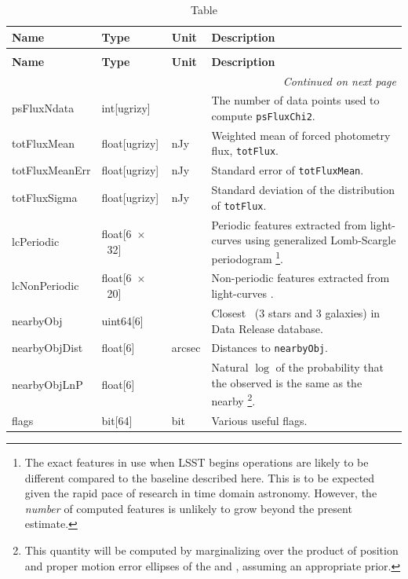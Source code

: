 \documentclass[SE,lsstdraft,toc]{lsstdoc}
\newcommand\x         {\hbox{$\times$}}
\renewcommand{\DR}{{Data Release database}\xspace}
\newenvironment{schema}[3]{%
\setlength\LTleft{0pt}
\setlength\LTright{\fill}
\begin{longtable}{p{0.2\textwidth}p{0.14\textwidth}p{0.14\textwidth}p{0.41\textwidth}}

\caption[#1]{#2\label{#3}}\\

\hline \textbf{Name} & \textbf{Type} & \textbf{Unit} & \textbf{Description}\\ \hline
\endfirsthead

\caption[#1]{#2}\\

\hline \textbf{Name} & \textbf{Type} & \textbf{Unit} & \textbf{Description}\\ \hline
\endhead

\hline \multicolumn{4}{r}{\emph{Continued on next page}} \\
\endfoot

\hline\hline
\endlastfoot
}{%
\hline
\end{longtable}
}
\begin{document}
\begin{schema}{\DIAObject Table}{\DIAObject Table}{tbl:diaobjectTable}
psFluxNdata & int[ugrizy] & ~ & The number of data points used to compute \texttt{psFluxChi2}. \\

totFluxMean & float[ugrizy] & nJy & Weighted mean of forced photometry flux, \texttt{totFlux}.\\

totFluxMeanErr & float[ugrizy] & nJy & Standard error of \texttt{totFluxMean}. \\

totFluxSigma & float[ugrizy] & nJy & Standard deviation of the distribution of \texttt{totFlux}. \\





lcPeriodic & float[6~\x~32] & ~ & Periodic features extracted from \newtext{\DIASource} light-curves using generalized Lomb-Scargle periodogram \citep[Table~4,][]{2011ApJ...733...10R}\footnote{The exact features in use when LSST begins operations are likely to be different compared to the baseline described here. This is to be expected given the rapid pace of research in time domain astronomy. However, the \emph{number} of computed features is unlikely to grow beyond the present estimate.}. \\

lcNonPeriodic & float[6~\x~20] & ~ & Non-periodic features extracted from \newtext{\DIASource} light-curves \citep[Table~5,][]{2011ApJ...733...10R}. \\

nearbyObj   & uint64[6] & ~ & Closest \Objects\ (3 stars and 3 galaxies) in \DR.\\

nearbyObjDist   & float[6] & arcsec & Distances to \texttt{nearbyObj}. \\

nearbyObjLnP   & float[6] & ~ &  Natural $\log$ of the probability that the observed \DIAObject is the same as the nearby \Object\footnote{This quantity will be computed by marginalizing over the product of position and proper motion error ellipses of the \Object and \DIAObject, assuming an appropriate prior.}. \\

flags & bit[64] & bit & Various useful flags. \\

\end{schema}
\end{document}
